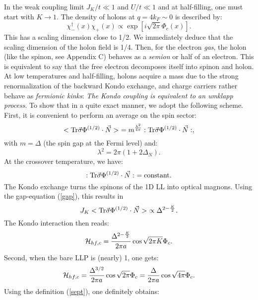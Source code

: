 In the weak coupling limit $J_K/t\ll 1$ and $U/t\ll 1$ and at 
half-filling, one must start with
$K\rightarrow 1$. The density of holons
at $q=4k_F\sim 0$ is described by\cite{KV}:
\begin{equation}
\chi_-^{\dag}(x)\chi_+(x)\propto \exp[i\sqrt{2\pi}\Phi_c(x)].
\end{equation}
This has a scaling dimension close to 1/2. We immediately deduce
that the scaling dimension of the holon field is 1/4. Then, for the
electron {\it gas}, the 
holon (like the spinon, see Appendix C) behaves 
as a {\it semion} or half of an electron\cite{BS}. This is equivalent to say
that the free electron decomposes itself into spinon and holon.
\vskip 0.1cm
At low temperatures and half-filling, holons 
acquire a mass due to the strong renormalization of the
backward Kondo exchange, and charge carriers rather behave as
{\it fermionic kinks}: {\it The Kondo coupling is
equivalent to an umklapp process}. To show that in a quite exact
manner, we adopt
the following scheme.
First, it is convenient to perform an average on the spin sector:
\begin{equation}
<\hbox{Tr}\vec{\sigma}\Phi^{(1/2)}\cdot\vec{N}>\ =
m^{\frac{\lambda^2}{4\pi}}
:\hbox{Tr}\vec{\sigma}\Phi^{(1/2)}\cdot\vec{N}:,
\end{equation}
with $m=\Delta$ (the spin gap at the Fermi level) and:
\begin{equation}
{\lambda}^2=2\pi(1+2\Delta_N).
\end{equation}
At the crossover temperature, we have:
\begin{equation}
:\hbox{Tr}\vec{\sigma}\Phi^{(1/2)}\cdot\vec{N}:\ =\hbox{constant}.
\end{equation}
The Kondo exchange turns the spinons of the 1D LL into optical magnons.
Using the gap-equation (\ref{gap}), this results in
\begin{equation}
J_K<\hbox{Tr}\vec{\sigma}\Phi^{(1/2)}\cdot
\vec{N}>\ \propto \Delta^{2-\frac{K}{2}}.
\end{equation}
The Kondo interaction then reads:
\begin{equation}
{\cal H}_{hf,c}=\frac{\Delta^{2-\frac{K}{2}}}{2\pi a}
\cos\sqrt{2\pi K}\Phi_c.
\end{equation}
Second, when the bare LLP is (nearly) 1, one gets:
\begin{equation}
{\cal H}_{hf,c}=\frac{\Delta^{3/2}}{2\pi a}\cos\sqrt{2\pi}\Phi_c
=\frac{\Delta}{2\pi a}\cos\sqrt{4\pi}\Phi_c.
\end{equation}
Using the definition (\ref{sept}), one definitely obtains:
